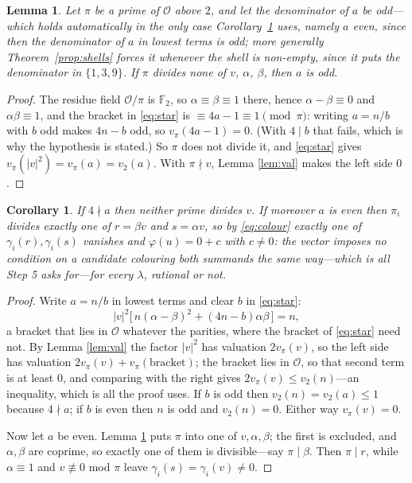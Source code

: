 \documentclass[11pt,reqno]{amsart}
\theoremstyle{plain}
\newtheorem{lemma}[theorem]{Lemma}
\newtheorem{corollary}[theorem]{Corollary}
\theoremstyle{definition}
\newcommand{\F}{\mathbb{F}}
\newcommand{\Ok}{\mathcal{O}}
\begin{document}
\begin{lemma}\label{lem:E}
Let $\pi$ be a prime of $\Ok$ above $2$, and let the denominator of $a$ be
odd---which holds automatically in the only case Corollary~\ref{cor:even} uses,
namely $a$ even, since then the denominator of $a$ in lowest terms is odd; more
generally Theorem~\ref{prop:shells} forces it whenever the shell is non-empty,
since it puts the denominator in $\{1,3,9\}$. If $\pi$ divides none of $v$,
$\alpha$, $\beta$, then $a$ is odd.
\end{lemma}

\begin{proof}
The residue field $\Ok/\pi$ is $\F_2$, so $\alpha \equiv \beta \equiv 1$ there,
hence $\alpha - \beta \equiv 0$ and $\alpha\beta \equiv 1$, and the bracket in
\eqref{eq:star} is $\equiv 4a-1 \equiv 1 \pmod \pi$: writing $a = n/b$ with $b$
odd makes $4n - b$ odd, so $v_\pi(4a-1) = 0$. (With $4 \mid b$ that fails, which
is why the hypothesis is stated.) So
$\pi$ does not divide it, and \eqref{eq:star} gives
$v_\pi(\lvert v \rvert^2) = v_\pi(a) = v_2(a)$. With $\pi \nmid v$, Lemma
\ref{lem:val} makes the left side $0$.
\end{proof}

\begin{corollary}\label{cor:even}
If $4 \nmid a$ then neither prime divides $v$. If moreover $a$ is even then
$\pi_i$ divides exactly one of $r = \beta v$ and $s = \alpha v$, so by
\eqref{eq:colour} exactly one of $\gamma_i(r), \gamma_i(s)$ vanishes and
$\varphi(u) = 0 + c$ with $c \ne 0$: the vector imposes no condition on a
candidate colouring both summands the same way---which is all Step 5 asks
for---for every $\lambda$, rational or not.
\end{corollary}

\begin{proof}
Write $a = n/b$ in lowest terms and clear $b$ in \eqref{eq:star}:
\[
  \lvert v \rvert^2 \big[\, n(\alpha-\beta)^2 + (4n-b)\alpha\beta \,\big] = n ,
\]
a bracket that lies in $\Ok$ whatever the parities, where the bracket of
\eqref{eq:star} need not. By Lemma \ref{lem:val} the factor $\lvert v\rvert^2$ has
valuation $2v_\pi(v)$, so the left side has valuation $2v_\pi(v) + v_\pi(\text{bracket})$;
the bracket lies in $\Ok$, so that second term is at least $0$, and comparing with
the right gives $2v_\pi(v) \le v_2(n)$---an inequality, which is all the proof
uses. If $b$ is odd then
$v_2(n) = v_2(a) \le 1$ because $4 \nmid a$; if $b$ is even then $n$ is odd and
$v_2(n) = 0$. Either way $v_\pi(v) = 0$.

Now let $a$ be even. Lemma \ref{lem:E} puts $\pi$ into one of $v, \alpha, \beta$;
the first is excluded, and $\alpha,\beta$ are coprime, so exactly one of them is
divisible---say $\pi \mid \beta$. Then $\pi \mid r$, while $\alpha \equiv 1$ and
$v \not\equiv 0$ mod $\pi$ leave $\gamma_i(s) = \gamma_i(v) \ne 0$.
\end{proof}
\end{document}
